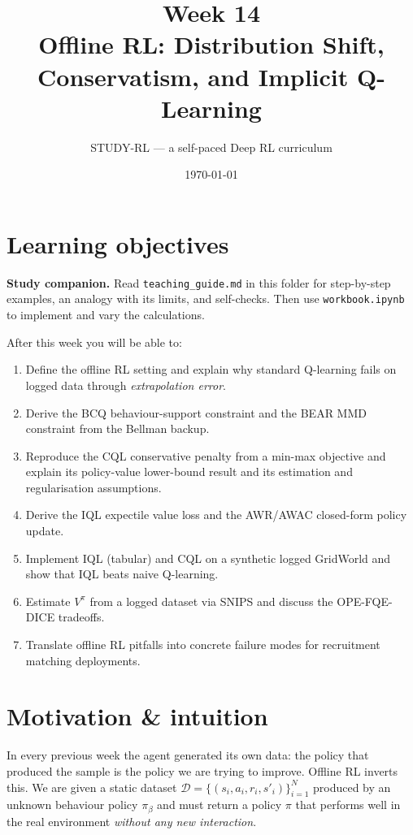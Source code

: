 \documentclass[11pt,oneside]{scrbook}
\title{{\color{rlblue}\textbf{Week 14} \\ \Huge Offline RL: Distribution Shift, Conservatism, and Implicit Q-Learning}}
\author{STUDY-RL --- a self-paced Deep RL curriculum}
\date{\today}
\begin{document}
\maketitle
\tableofcontents
\newpage

\chapter*{Learning objectives}


\noindent\textbf{Study companion.} Read \texttt{teaching\_guide.md} in this
folder for step-by-step examples, an analogy with its limits, and self-checks.
Then use \texttt{workbook.ipynb} to implement and vary the calculations.
\par\medskip

\begin{keyidea}
After this week you will be able to:
\begin{enumerate}
  \item Define the offline RL setting and explain why standard Q-learning fails on logged data
        through \emph{extrapolation error}.
  \item Derive the BCQ behaviour-support constraint and the BEAR MMD constraint from the
        Bellman backup.
  \item Reproduce the CQL conservative penalty from a min-max objective and explain its
        policy-value lower-bound result and its estimation and regularisation assumptions.
  \item Derive the IQL expectile value loss and the AWR/AWAC closed-form policy update.
  \item Implement IQL (tabular) and CQL on a synthetic logged GridWorld and show
        that IQL beats naive Q-learning.
  \item Estimate $V^\pi$ from a logged dataset via SNIPS and discuss the OPE-FQE-DICE tradeoffs.
  \item Translate offline RL pitfalls into concrete failure modes for recruitment matching
        deployments.
\end{enumerate}
\end{keyidea}

\chapter{Motivation \& intuition}

In every previous week the agent generated its own data: the policy that produced the
sample is the policy we are trying to improve.  Offline RL inverts this. We are
given a static dataset $\mathcal{D} = \{(s_i, a_i, r_i, s'_i)\}_{i=1}^N$ produced by an
unknown behaviour policy $\pi_\beta$ and must return a policy $\pi$ that performs well
in the real environment \emph{without any new interaction}.
\end{document}
